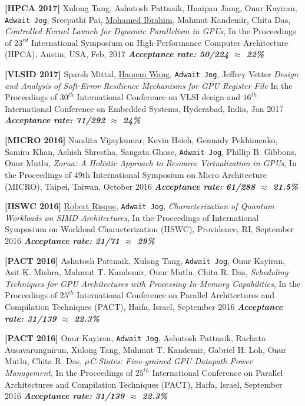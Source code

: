 \documentclass[10pt,a4]{article}
\begin{document}
\begin{description}
\item 
{\bf [HPCA 2017]}
Xulong Tang, Ashutosh Pattnaik, Huaipan Jiang, Onur Kayiran, {\tt Adwait Jog}, Sreepathi Pai, \underline{Mohamed Ibrahim},
Mahmut Kandemir, Chita Das, 
{\it Controlled Kernel Launch for Dynamic Parallelism in GPUs},
In the Proceedings of $23^{rd}$ International Symposium on High-Performance Computer Architecture (HPCA), 
Austin, USA, Feb, 2017
\textbf{\textit{Acceptance rate: 50/224 $\approx$ 22\%}}

\item 
{\bf [VLSID 2017]}
Sparsh Mittal, \underline{Haonan Wang}, {\tt Adwait Jog}, Jeffrey Vetter
{\it Design and Analysis of Soft-Error Resilience Mechanisms for GPU Register File}
In the Proceedings of $30^{th}$ International Conference on VLSI design and $16^{th}$ International Conference on
Embedded Systems, Hyderabad, India, Jan 2017
\textbf{\textit{Acceptance rate: 71/292 $\approx$ 24\%}}

\item
{\bf [MICRO 2016]}
Nandita Vijaykumar, Kevin Hsieh, Gennady Pekhimenko, Samira Khan, Ashish Shrestha, Saugata Ghose, {\tt Adwait Jog}, Phillip B. Gibbons, Onur Mutlu, 
{\it Zorua: A Holistic Approach to Resource Virtualization in GPUs},
In the Proceedings of 49th International Symposium on Micro Architecture (MICRO), Taipei, Taiwan, October 2016 
\textbf{\textit{Acceptance rate: 61/288 $\approx$ 21.5\%}}

\item
{\bf [IISWC 2016]}
\underline{Robert Risque}, {\tt Adwait Jog}, 
{\it Characterization of Quantum Workloads on SIMD Architectures},
In the Proceedings of International Symposium on Workload Characterization (IISWC), Providence, RI, September 2016 
\textbf{\textit{Acceptance rate: 21/71 $\approx$ 29\%}}

\item
{\bf [PACT 2016]}
Ashutosh Pattnaik, Xulong Tang, {\tt Adwait Jog}, Onur Kayiran, Asit K. Mishra, Mahmut T. Kandemir, 
Onur Mutlu, Chita R. Das, 
{\it Scheduling Techniques for GPU Architectures with Processing-In-Memory Capabilities},
In the Proceedings of $25^{th}$ International Conference on Parallel Architectures and Compilation Techniques (PACT), 
Haifa, Israel, September 2016 
\textbf{\textit{Acceptance rate: 31/139 $\approx$ 22.3\%}}

\item
{\bf [PACT 2016]}
Onur Kayiran, {\tt Adwait Jog}, Ashutosh Pattnaik, Rachata Ausavarungnirun, Xulong Tang, Mahmut T. Kandemir, Gabriel H. Loh, Onur Mutlu, Chita R. Das, 
{\it $\mu$C-States: Fine-grained GPU Datapath Power Management},
In the Proceedings of $25^{th}$ International Conference on Parallel Architectures and Compilation Techniques (PACT), 
Haifa, Israel, September 2016 
\textbf{\textit{Acceptance rate: 31/139 $\approx$ 22.3\%}}


\end{description}
\end{document}
